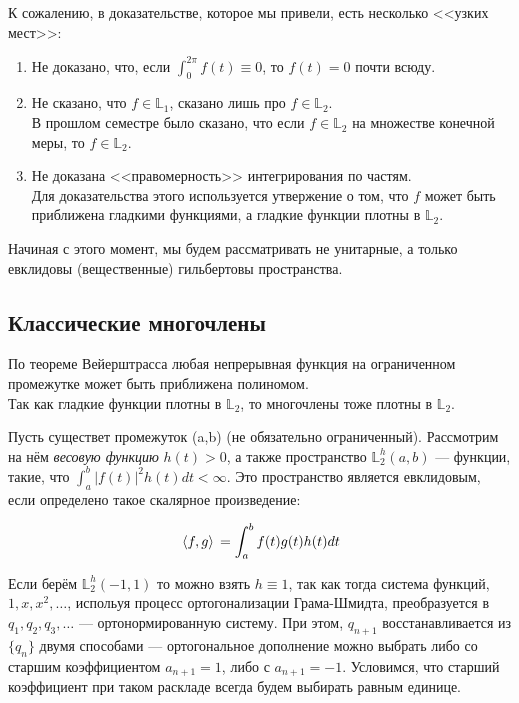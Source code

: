 	К сожалению, в доказательстве, которое мы привели, есть несколько <<узких мест>>:
	\begin{enumerate}
		\item Не доказано, что, если $\int_0^{2\pi} f(t) \equiv 0$, то $f(t) = 0$ почти всюду.
		\item Не сказано, что $f \in \mathbb{L}_1$, сказано лишь про $f \in \mathbb{L}_2$. \\
		В прошлом семестре было сказано, что если $f \in \mathbb{L}_2$ на множестве конечной меры, то $f \in \mathbb{L}_2$.
		\item Не доказана <<правомерность>> интегрирования по частям. \\
		Для доказательства этого используется утвержение о том, что $f$ может быть приближена гладкими функциями, а
		гладкие функции плотны в $\mathbb{L}_2$.
	\end{enumerate}
	
	Начиная с этого момент, мы будем рассматривать не унитарные, а только евклидовы (вещественные) гильбертовы пространства.
	
	\subsection{Классические многочлены}
	По теореме Вейерштрасса любая непрерывная функция на ограниченном промежутке может быть приближена полиномом. \\
	Так как гладкие функции плотны в $\mathbb{L}_2$, то многочлены тоже плотны в $\mathbb{L}_2$.
	
	Пусть существет промежуток (a,b) (не обязательно ограниченный). Рассмотрим на нём \textit{весовую функцию} $h(t) > 0$, а также пространство
	$\mathbb{L}_2^h (a,b)$ --- функции, такие, что $\int_a^b |f(t)|^2 h(t) dt < \infty$.
	Это пространство является евклидовым, если определено такое скалярное произведение:
	
	$$ \, \langle f, g \rangle \, = \int_a^b f(t) g(t) h(t) dt $$
	
	Если берём $ \mathbb{L}_2^h (-1, 1)$ то можно взять $h \equiv 1$, так как тогда система функций,
	$1, x, x^2, \ldots$, испольуя процесс ортогонализации Грама-Шмидта, преобразуется в $q_1, q_2, q_3, \ldots$ --- ортонормированную 
	систему. При этом, $q_{n+1}$ восстанавливается из $ \{ q_n \} $ двумя способами --- ортогональное дополнение можно выбрать либо
	со старшим коэффициентом $a_{n+1} = 1$, либо с $a_{n+1} = -1$. Условимся, что старший коэффициент при таком раскладе всегда будем 
	выбирать равным единице.
	
